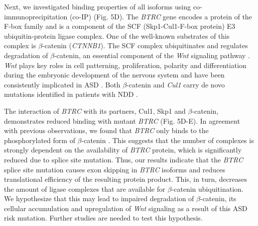 \documentclass[12pt,chapterheads,final]{ucsd}
\begin{document}
Next, we investigated binding properties of all isoforms using co-immunoprecipitation (co-IP) (Fig. 5D). The \textit{BTRC} gene encodes a protein of the F-box family and is a component of the SCF (Skp1-Cul1-F-box protein) E3 ubiquitin-protein ligase complex. One of the well-known substrates of this complex is $\beta$-catenin (\textit{CTNNB1}). The SCF complex ubiquitinates and regulates degradation of $\beta$-catenin, an essential component of the \textit{Wnt} signaling pathway \cite{Winston1999}. \textit{Wnt} plays key roles in cell patterning, proliferation, polarity and differentiation during the embryonic development of the nervous system \cite{Ciani2005} and have been consistently implicated in ASD \cite{Kwan2016,Iakoucheva2019}. Both $\beta$-catenin and \textit{Cul1} carry de novo mutations identified in patients with NDD \cite{Satterstrom2019}. \par
The interaction of \textit{BTRC} with its partners, Cul1, Skp1 and $\beta$-catenin, demonstrates reduced binding with mutant \textit{BTRC} (Fig. 5D-E). In agreement with previous observations, we found that \textit{BTRC} only binds to the phosphorylated form of $\beta$-catenin \cite{Winston1999}. This suggests that the number of complexes is strongly dependent on the availability of \textit{BTRC} protein, which is significantly reduced due to splice site mutation. Thus, our results indicate that the \textit{BTRC} splice site mutation causes exon skipping in \textit{BTRC} isoforms and reduces translational efficiency of the resulting protein product. This, in turn, decreases the amount of ligase complexes that are available for $\beta$-catenin ubiquitination. We hypothesize that this may lead to impaired degradation of $\beta$-catenin, its cellular accumulation and upregulation of \textit{Wnt} signaling as a result of this ASD risk mutation. Further studies are needed to test this hypothesis.  \par
\end{document}
